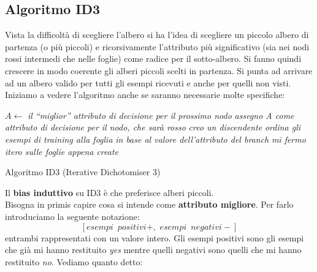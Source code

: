 \subsection{Algoritmo ID3}
Vista la difficoltà di scegliere l'albero si ha l'idea di scegliere un piccolo
albero di partenza (o più piccoli) e ricorsivamente l'attributo più
significativo (sia nei nodi rossi intermedi che nelle foglie) come radice per il
sotto-albero. Si fanno quindi crescere in modo 
coerente gli alberi piccoli scelti in partenza. Si punta ad arrivare ad un
albero valido per tutti gli esempi ricevuti e anche per quelli non visti.\\
Iniziamo a vedere l'algoritmo anche se saranno necessarie molte specifiche:
\begin{algorithm}[H]
  \begin{algorithmic}
    \State $A \gets$ \textit{il ``miglior'' attributo di decisione per il
    prossimo nodo}
    \State \textit{assegno A come attributo di decisione per il nodo, che sarà
    rosso}
    \State \textit{creo un discendente}
    \EndFor
    \State \textit{ordina gli esempi di training alla foglia}
    \State \textit{in base al valore dell'attributo del branch}
    \State \textit{mi fermo}
    \Else
    \State \textit{itero sulle foglie appena create}
    \EndIf
    \EndFunction
  \end{algorithmic}
  \caption{Algoritmo ID3 (Iterative Dichotomiser 3)}
\end{algorithm}
Il \textbf{bias induttivo} su ID3 è che preferisce alberi piccoli.\\
Bisogna in primis capire cosa si intende come \textbf{attributo migliore}. Per
farlo introduciamo la seguente notazione:
\[[esempi\,\,\,positivi+,\,\,esempi\,\,\,negativi-]\]
entrambi rappresentati con un valore intero. Gli esempi positivi sono gli esempi
che già mi hanno restituito \textit{yes} mentre quelli negativi sono quelli che mi hanno restituito \textit{no}.
Vediamo quanto detto:

\begin{figure}[H]
  \centering
\end{figure}


